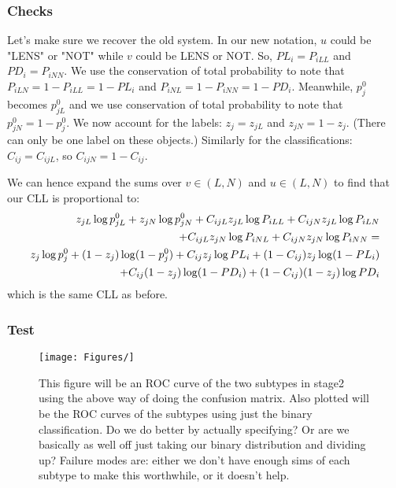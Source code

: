 \documentclass[useAMS,usenatbib,a4paper]{mn2e}
\begin{document}
\subsubsection{Checks}

Let's make sure we recover the old system. In our new notation, $u$ could be
"LENS" or "NOT" while $v$ could be LENS or NOT. So, $PL_i = P_{iLL}$ and $PD_i
= P_{iNN}$. We use the conservation of total probability to note that
$P_{iLN} = 1 - P_{iLL} = 1 - PL_i$ and $P_{iNL} = 1 - P_{iNN} = 1 -
PD_i$. Meanwhile, $p_j^0$ becomes $p_{jL}^0$ and we use conservation of total
probability to note that $p_{jN}^0 = 1 - p_{j}^0$. We now account for the
labels: $z_{j} = z_{jL}$ and $z_{jN} = 1 - z_{j}$. (There can only be one
label on these objects.) Similarly for the classifications: $C_{ij} = C_{ijL}$,
so $C_{ijN} = 1 - C_{ij}$.

We can hence expand the
sums over $v \in (L, N)$ and $u \in (L, N)$ to find that our CLL is
proportional to:
\begin{align}
z_{jL} \log p_{jL}^0 + z_{jN} \log p_{jN}^0 +
C_{ijL} z_{jL} \log P_{iLL} + C_{ijN} z_{jL} \log P_{iLN} \notag\\ + C_{ijL} z_{jN} \log
P_{iNL} + C_{ijN} z_{jN} \log P_{iNN} = \notag\\
z_j \log p_j^0 + (1 - z_j) \log (1 - p_j^0) + C_{ij} z_j \log PL_i + (1 -
C_{ij}) z_j \log (1 - PL_i) \notag\\
+ C_{ij} (1 - z_j) \log (1 - PD_i) + (1 - C_{ij})
(1 - z_j) \log PD_i
\end{align}
which is the same CLL as before.

\subsubsection{Test}

\begin{figure}
\begin{center}
    \texttt{[image: Figures/]}
\end{center}
\caption{This figure will be an ROC curve of the two subtypes in stage2 using
the above way of doing the confusion matrix. Also plotted will be the ROC
curves of the subtypes using just the binary classification. Do we do better by actually specifying? Or are we basically as well
off just taking our binary distribution and dividing up? Failure modes are:
either we don't have enough sims of each subtype to make this worthwhile, or it
doesn't help.}
\label{fig:}
\end{figure}
\end{document}
